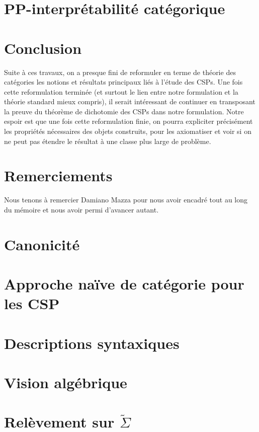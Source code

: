 \documentclass[12pt]{article}
\newcommand{\tsigma}{\widetilde{\Sigma}}
\begin{document}
\section{PP-interprétabilité catégorique}\label{secPP}


\section{Conclusion}

Suite à ces travaux, on a presque fini de reformuler en terme de théorie des
catégories les notions et résultats principaux liés à l'étude des CSPs. Une
fois cette reformulation terminée (et surtout le lien entre notre formulation
et la théorie standard mieux compris), il serait intéressant de continuer en
transposant la preuve du théorème de dichotomie des CSPs dans notre
formulation. Notre espoir est que une fois cette reformulation finie, on pourra
expliciter précisément les propriétés nécessaires des objets construits, pour
les axiomatiser et voir si on ne peut pas étendre le résultat à une classe plus
large de problème.

\section*{Remerciements}

Nous tenons à remercier Damiano Mazza pour nous avoir encadré tout au long du
mémoire et nous avoir permi d'avancer autant.


\appendix
\newpage
\section{Canonicité}\label{appCanon}


\newpage
\section{Approche naïve de catégorie pour les CSP}\label{appNaif}


\newpage
\section{Descriptions syntaxiques}\label{appSyn}


\newpage
\section{Vision algébrique}\label{appClones}


\newpage
\section{Relèvement sur $\tsigma$}

\end{document}
